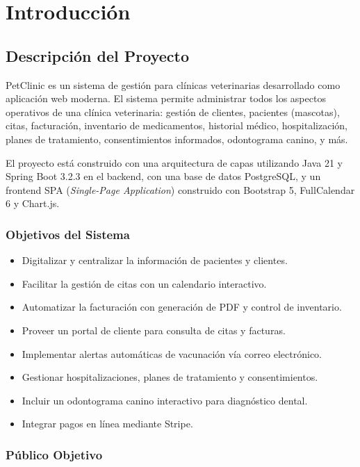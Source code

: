 \chapter{Introducci\'on}

\section{Descripci\'on del Proyecto}

PetClinic es un sistema de gesti\'on para cl\'inicas veterinarias desarrollado como aplicaci\'on web moderna. El sistema permite administrar todos los aspectos operativos de una cl\'inica veterinaria: gesti\'on de clientes, pacientes (mascotas), citas, facturaci\'on, inventario de medicamentos, historial m\'edico, hospitalizaci\'on, planes de tratamiento, consentimientos informados, odontograma canino, y m\'as.

El proyecto est\'a construido con una arquitectura de capas utilizando Java 21 y Spring Boot 3.2.3 en el backend, con una base de datos PostgreSQL, y un frontend SPA (\textit{Single-Page Application}) construido con Bootstrap 5, FullCalendar 6 y Chart.js.

\subsection{Objetivos del Sistema}

\begin{itemize}
    \item Digitalizar y centralizar la informaci\'on de pacientes y clientes.
    \item Facilitar la gesti\'on de citas con un calendario interactivo.
    \item Automatizar la facturaci\'on con generaci\'on de PDF y control de inventario.
    \item Proveer un portal de cliente para consulta de citas y facturas.
    \item Implementar alertas autom\'aticas de vacunaci\'on v\'ia correo electr\'onico.
    \item Gestionar hospitalizaciones, planes de tratamiento y consentimientos.
    \item Incluir un odontograma canino interactivo para diagn\'ostico dental.
    \item Integrar pagos en l\'inea mediante Stripe.
\end{itemize}

\subsection{P\'ublico Objetivo}

